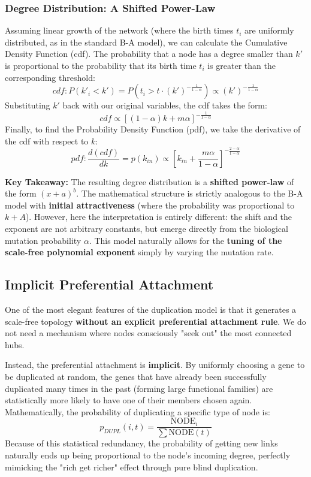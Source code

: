 \subsubsection{Degree Distribution: A Shifted Power-Law}
Assuming linear growth of the network (where the birth times \( t_i \) are uniformly distributed, as in the standard B-A model), we can calculate the Cumulative Density Function (cdf). The probability that a node has a degree smaller than \( k' \) is proportional to the probability that its birth time \( t_i \) is greater than the corresponding threshold:
\[
    cdf: P(k'_i < k') = P\left( t_i > t \cdot (k')^{-\frac{1}{1 - \alpha}} \right) \propto (k')^{-\frac{1}{1 - \alpha}}
\]
Substituting \( k' \) back with our original variables, the cdf takes the form:
\[
    cdf \propto [(1 - \alpha)k + m\alpha]^{-\frac{1}{1 - \alpha}}
\]
Finally, to find the Probability Density Function (pdf), we take the derivative of the cdf with respect to \( k \):
\[
    pdf: \frac{d(cdf)}{dk} = p(k_{in}) \propto \left[ k_{in} + \frac{m\alpha}{1 - \alpha} \right]^{-\frac{2 - \alpha}{1 - \alpha}}
\]

\textbf{Key Takeaway:} The resulting degree distribution is a \textbf{shifted power-law} of the form \( (x + a)^b \).
The mathematical structure is strictly analogous to the B-A model with \textbf{initial attractiveness} (where the probability was proportional to \( k + A \)). However, here the interpretation is entirely different: the shift and the exponent are not arbitrary constants, but emerge directly from the biological mutation probability \( \alpha \). This model naturally allows for the \textbf{tuning of the scale-free polynomial exponent} simply by varying the mutation rate.

\subsection{Implicit Preferential Attachment}
One of the most elegant features of the duplication model is that it generates a scale-free topology \textbf{without an explicit preferential attachment rule}. We do not need a mechanism where nodes consciously "seek out" the most connected hubs.

Instead, the preferential attachment is \textbf{implicit}. By uniformly choosing a gene to be duplicated at random, the genes that have already been successfully duplicated many times in the past (forming large functional families) are statistically more likely to have one of their members chosen again.
Mathematically, the probability of duplicating a specific type of node is:
\[
    p_{DUPL}(i, t) = \frac{\text{NODE}_i}{\sum \text{NODE}(t)}
\]
Because of this statistical redundancy, the probability of getting new links naturally ends up being proportional to the node's incoming degree, perfectly mimicking the "rich get richer" effect through pure blind duplication.

